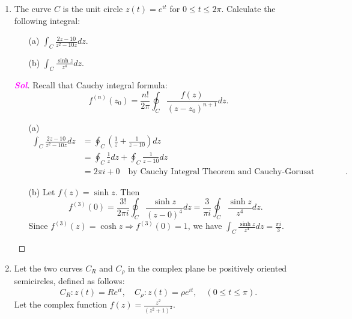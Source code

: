 \documentclass{article}
\theoremstyle{definition}
\newcommand{\of}[1]{\left( #1 \right)}
\newcommand{\sol}{\textcolor{magenta}{\bf Sol}}
\renewcommand{\Re}{\operatorname{Re}}
\renewcommand{\Im}{\operatorname{Im}}
\begin{document}
\begin{enumerate}
		\newpage
		\item The curve $C$ is the unit circle $z(t) = e^{it}$ for $0\leq t\leq 2\pi$. Calculate the following integral: \begin{enumerate}
			\item[(a)] $\displaystyle\int_C\frac{2z-10}{z^2-10z}dz$.
			\vspace{4pt}
			\item[(b)] $\displaystyle\int_C\frac{\sinh z}{z^4}dz$.
		\end{enumerate}
		\begin{proof}[\sol]
			Recall that Cauchy integral formula: \[
			f^{(n)}(z_0)=\frac{n!}{2\pi}\oint_C\frac{f\of{z}}{\of{z-z_0}^{n+1}}dz.
			\]
			\begin{itemize}
				\item[(a)] \begin{align*}
				\int_C\frac{2z-10}{z^2-10z}dz&=\oint_C\of{\frac{1}{z}+\frac{1}{z-10}}dz\\
				&=\oint_C\frac{1}{z}dz+\oint_C\frac{1}{z-10}dz\\
				&=2\pi i+0\quad\text{by Cauchy Integral Theorem and Cauchy-Gorusat Theorem}.
				\end{align*}
				\item[(b)] Let $f\of{z}=\sinh z$. Then \[
				f^{(3)}(0)=\frac{3!}{2\pi i}\oint_C\frac{\sinh z}{(z-0)^4}dz=\frac{3}{\pi i}\oint_C\frac{\sinh z}{z^4}dz.
				\] Since $f^{(3)}(z)=\cosh z\Rightarrow f^{(3)}(0)=1$, we have $\displaystyle\int_C\frac{\sinh z}{z^4}dz=\frac{\pi i}{3}$.
			\end{itemize}
		\end{proof}
		\vspace{8pt}
		\item Let the two curves $C_R$ and $C_\rho$ in the complex plane be positively oriented semicircles, defined as follows:
		\[
		C_R: z(t) = Re^{it},\quad  C_\rho: z(t) = \rho e^{it},\quad \of{0\leq t\leq\pi}.
		\] Let the complex function $\displaystyle f(z) = \frac{z^2}{\of{z^2+1}^2}$. 
		\begin{center}
\end{center}
\end{enumerate}
\end{document}
